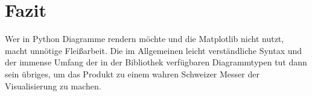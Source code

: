 \section{Fazit}

Wer in Python Diagramme rendern möchte und die Matplotlib nicht nutzt, macht unnötige Fleißarbeit. Die im Allgemeinen leicht verständliche Syntax und der immense Umfang der in der Bibliothek verfügbaren Diagrammtypen tut dann sein übriges, um das Produkt zu einem wahren Schweizer Messer der Visualisierung zu machen.

